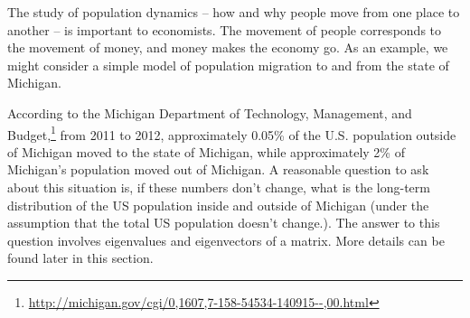  \label{chap:eigenspaces}

\vspace*{-17 pt}

\vspace*{13 pt}

\label{sec:appl_pop_dynam}

The study of population dynamics -- how and why people move from one place to another -- is important to economists. The movement of people corresponds to the movement of money, and money makes the economy go. As an example, we might consider a simple model of population migration to and from the state of Michigan.

According to the Michigan Department of Technology, Management, and Budget,\footnote{\url{http://michigan.gov/cgi/0,1607,7-158-54534-140915--,00.html}} from 2011 to 2012, approximately 0.05\% of the U.S. population outside of Michigan moved to the state of Michigan, while approximately 2\% of Michigan's population moved out of Michigan. A reasonable question to ask about this situation is, if these numbers don't change, what is the long-term distribution of the US population inside and outside of Michigan (under the assumption that the total US population doesn't change.). The answer to this question involves eigenvalues and eigenvectors of a matrix. More details can be found later in this section. 


\label{sec:egspace_intro}



